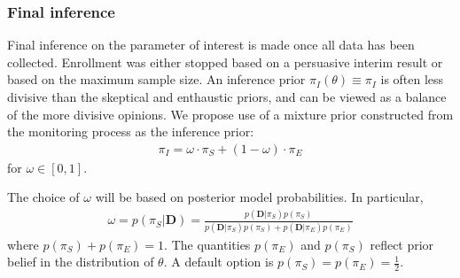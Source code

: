 \documentclass[12pt]{article}
\begin{document}
\subsubsection{Final inference}
Final inference on the parameter of interest is made once all data has been collected. Enrollment was either stopped based on a persuasive interim result or based on the maximum sample size. An inference prior $\pi_{I}(\theta)\equiv\pi_{I}$ is often less divisive than the skeptical and enthaustic priors, and can be viewed as a balance of the more divisive opinions. We propose use of a mixture prior constructed from the monitoring process as the inference prior:
\begin{align}
\pi_{I}=\omega\cdot\pi_{S}+(1-\omega)\cdot\pi_E
\end{align}
for $\omega\in[0,1]$. 

The choice of $\omega$ will be based on posterior model probabilities. In particular,
\begin{align}
\omega=p(\pi_S|\mathbf{D})=\frac{p(\mathbf{D}|\pi_S)p(\pi_S)}{p(\mathbf{D}|\pi_S)p(\pi_S)+p(\mathbf{D}|\pi_E)p(\pi_E)}
\end{align}
where $p(\pi_S)+p(\pi_E)=1$. The quantities $p(\pi_E)$ and $p(\pi_S)$ reflect prior belief in the distribution of $\theta$. A default option is $p(\pi_S)=p(\pi_E)=\frac{1}{2}$.
%

\newpage
\end{document}
